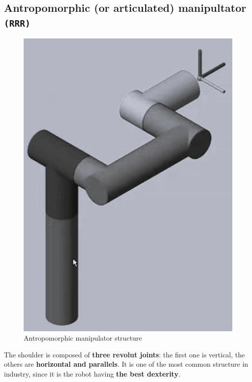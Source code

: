 \subsection{Antropomorphic (or articulated) manipultator \texttt{(RRR)}}
\begin{multicols}{2}
    \begin{figure}[H]
        \centering
        \includegraphics[scale=0.5]{img/antrop_man.png}
        \caption{Antropomorphic manipulator structure}
    \end{figure}
    The shoulder is composed of \textbf{three revolut joints}: the first one is vertical, the others are \textbf{horizontal and parallels}. It is one of the most common structure in industry, since it is the robot having \textbf{the best dexterity}.
\end{multicols}

\newpage
